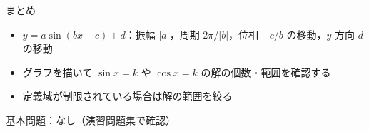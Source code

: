 \documentclass[aspectratio=43,professionalfonts,handout]{beamer}
\begin{document}
\begin{frame}{まとめ}
  \begin{itemize}
    \item $y = a\sin(bx + c) + d$：振幅 $|a|$，周期 $2\pi/|b|$，位相 $-c/b$ の移動，$y$ 方向 $d$ の移動
    \item グラフを描いて $\sin x = k$ や $\cos x = k$ の解の個数・範囲を確認する
    \item 定義域が制限されている場合は解の範囲を絞る
  \end{itemize}

  \vfill
  {\small 基本問題：なし（演習問題集で確認）}
\end{frame}
\end{document}
